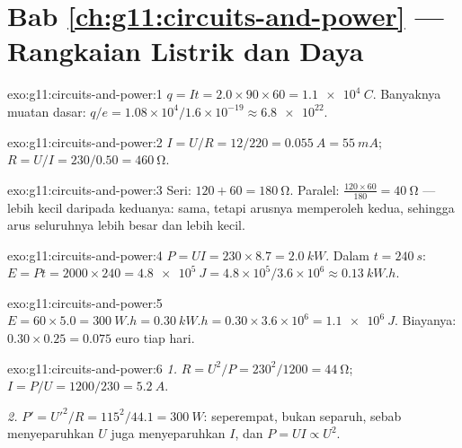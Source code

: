 \section*{Bab \ref{ch:g11:circuits-and-power} --- Rangkaian Listrik dan Daya}

\begin{solution}{exo:g11:circuits-and-power:1}
$q = It = 2.0 \times 90 \times 60 = \qty{1.1e4}{C}$. Banyaknya muatan
dasar: $q/e = 1.08\times10^{4}/1.6\times10^{-19} \approx \num{6.8e22}$.
\end{solution}

\begin{solution}{exo:g11:circuits-and-power:2}
$I = U/R = 12/220 = \qty{0.055}{A} = \qty{55}{mA}$;
$R = U/I = 230/0.50 = \qty{460}{\ohm}$.
\end{solution}

\begin{solution}{exo:g11:circuits-and-power:3}
Seri: $120 + 60 = \qty{180}{\ohm}$. Paralel:
$\frac{120 \times 60}{180}
= \qty{40}{\ohm}$ --- lebih kecil daripada
keduanya:  sama, tetapi arusnya memperoleh  kedua,
sehingga arus seluruhnya lebih besar dan  lebih kecil.
\end{solution}

\begin{solution}{exo:g11:circuits-and-power:4}
$P = UI = 230 \times 8.7 = \qty{2.0}{kW}$. Dalam $t = \qty{240}{s}$:
$E = Pt = 2000 \times 240 = \qty{4.8e5}{J} = 4.8\times10^{5}/3.6
\times10^{6} \approx \qty{0.13}{kW.h}$.
\end{solution}

\begin{solution}{exo:g11:circuits-and-power:5}
$E = 60 \times 5.0 = \qty{300}{W.h} = \qty{0.30}{kW.h} = 0.30 \times
3.6\times10^{6} = \qty{1.1e6}{J}$. Biayanya:
$0.30 \times 0.25 = 0.075$ euro tiap hari.
\end{solution}

\begin{solution}{exo:g11:circuits-and-power:6}
\emph{1.} $R = U^2/P = 230^2/1200 = \qty{44}{\ohm}$;
$I = P/U = 1200/230 = \qty{5.2}{A}$.

\emph{2.} $P' = U'^2/R = 115^2/44.1 = \qty{300}{W}$: seperempat, bukan
separuh, sebab menyeparuhkan $U$ juga menyeparuhkan $I$, dan
$P = UI \propto U^2$.
\end{solution}

